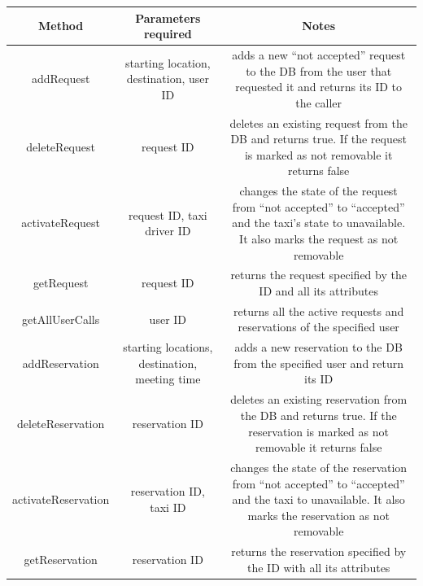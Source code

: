 \documentclass{article}
\begin{document}
\begin{itemize}
\begin{table}[H]
\begin{adjustbox}{width=1.2\textwidth}
\begin{tabular}{*{3}{c}}
					Method & Parameters required & Notes \\
					\midrule
					addRequest & starting location, destination, user ID & adds a new ``not accepted'' request to the DB from the user that requested it and returns its ID to the caller\\ 
					deleteRequest & request ID & deletes an existing request from the DB and returns true. If the request is marked as not removable it returns false\\ 
					activateRequest & request ID, taxi driver ID & changes the state of the request from ``not accepted'' to ``accepted'' and the taxi's state to unavailable. It also marks the request as not removable\\
					getRequest & request ID & returns the request specified by the ID and all its attributes\\
					getAllUserCalls& user ID & returns all the active requests and reservations of the specified user \\
					addReservation & starting locations, destination, meeting time & adds a new reservation to the DB from the specified user and return its ID\\
					deleteReservation & reservation ID & deletes an existing reservation from the DB and returns true. If the reservation is marked as not removable it returns false\\
					activateReservation & reservation ID, taxi ID & changes the state of the reservation from ``not accepted'' to ``accepted'' and the taxi to unavailable. It also marks the reservation as not removable\\
					getReservation & reservation ID & returns the reservation specified by the ID with all its attributes\\
					\bottomrule
				\end{tabular}	
			\end{adjustbox}
		\end{table}
	\end{itemize}
\end{document}

